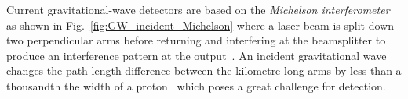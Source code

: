 Current gravitational-wave detectors are based on the \emph{Michelson interferometer} as shown in Fig.~\ref{fig:GW_incident_Michelson} where a laser beam is split down two perpendicular arms before returning and interfering at the beamsplitter to produce an interference pattern at the output~\cite{AdvancedLIGO:2015,bond_2010}. 
An incident gravitational wave changes the path length difference between the kilometre-long arms by less than a thousandth the width of a proton~\cite{GW150914} which poses a great challenge for detection. %
